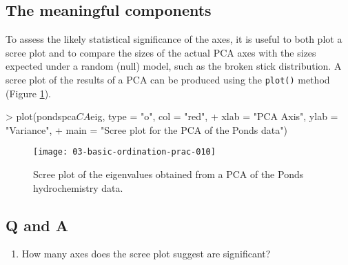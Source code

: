 \documentclass[a4paper,10pt]{article}
\begin{document}
\subsection{The meaningful components}
To assess the likely statistical significance of the axes, it is useful to both plot a scree plot and to compare the sizes of the actual PCA axes with the sizes expected under a random (null) model, such as the broken stick distribution. A scree plot of the results of a PCA can be produced using the \texttt{plot()} method (Figure \ref{pca_screeplot}).

\begin{Schunk}
\begin{Sinput}
> plot(pondspca$CA$eig, type = "o", col = "red",
+      xlab = "PCA Axis", ylab = "Variance",
+      main = "Scree plot for the PCA of the Ponds data")
\end{Sinput}
\end{Schunk}

\begin{figure}[t]
\begin{center}
\texttt{[image: 03-basic-ordination-prac-010]}
\caption{\label{pca_screeplot}Scree plot of the eigenvalues obtained from a PCA of the Ponds hydrochemistry data.}
\end{center}
\end{figure}

\subsection*{Q and A}
\begin{enumerate}
\item How many axes does the scree plot suggest are significant?
\end{enumerate}
\end{document}
